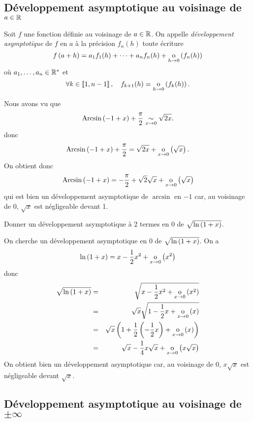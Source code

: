 \documentclass{magnolia}
\begin{document}
\subsection{Développement asymptotique au voisinage de $a\in\mathbb{R}$}

\begin{definition}[utile=-3]
Soit $f$ une fonction définie au voisinage de $a\in\mathbb{R}$. On appelle \emph{développement
asymptotique} de $f$ en $a$ à la précision $f_n(h)$ toute écriture
\[f\left(a+h\right)=a_1 f_1(h)+\cdots+a_n f_n(h)+\underset{h \rightarrow 0}{\text{o}}\left(f_n(h)\right)\]
où $a_1,\ldots,a_n\in{\mathbb{R}^*}$ et
\[\forall k\in\left\llbracket 1,n-1\right\rrbracket ,\quad f_{k+1}(h)=\underset{h \rightarrow 0}{\text{o}}\left(f_k(h)\right).\]
\end{definition}

\begin{remarqueUnique}
\remarque Nous avons vu que
  \[\operatorname{Arcsin}\left(-1+x\right)+\frac{\pi}{2}\underset{x\rightarrow 0}{\sim}\sqrt{2x}.\]
  donc
  \[\operatorname{Arcsin}\left(-1+x\right)+\frac{\pi}{2}=\sqrt{2x}+\underset{x \rightarrow 0}{\text{o}}\left(\sqrt{x}\right).\]
  On obtient donc
  \[\operatorname{Arcsin}\left(-1+x\right)=-\frac{\pi}{2}+\sqrt{2}\sqrt{x}+\underset{x \rightarrow 0}{\text{o}}\left(\sqrt{x}\right)\]
  qui est bien un développement asymptotique de $\arcsin$ en $-1$ car, au
  voisinage de 0, $\sqrt{x}$ est négligeable devant 1.
\end{remarqueUnique}

\begin{exoUnique}
\exo Donner un développement asymptotique à 2 termes en 0 de
  $\sqrt{\ln\left(1+x\right)}$.
  \begin{sol}
  On cherche un développement asymptotique en 0 de $\sqrt{\ln\left(1+x\right)}$.
  On a
  \[\ln\left(1+x\right)=x-\frac{1}{2}x^2+\underset{x \rightarrow 0}{\text{o}}\left(x^2\right)\]
  donc
  \begin{eqnarray*}
  \sqrt{\ln\left(1+x\right)}
  &=& \sqrt{x-\frac{1}{2}x^2+\underset{x \rightarrow 0}{\text{o}}\left(x^2\right)}\\
  &=& \sqrt{x}\sqrt{1-\frac{1}{2}x+\underset{x \rightarrow 0}{\text{o}}\left(x\right)}\\
  &=& \sqrt{x}\left(1+\frac{1}{2}\left(-\frac{1}{2}x\right)+\underset{x \rightarrow 0}{\text{o}}\left(x\right)\right)\\
  &=& \sqrt{x}-\frac{1}{4}x\sqrt{x}+\underset{x \rightarrow 0}{\text{o}}\left(x\sqrt{x}\right)
  \end{eqnarray*}
  On obtient bien un développement asymptotique car, au voisinage de 0,
  $x\sqrt{x}$ est négligeable devant $\sqrt{x}$.    
  \end{sol}
\end{exoUnique}

\subsection{Développement asymptotique au voisinage de $\pm\infty$}
\end{document}
